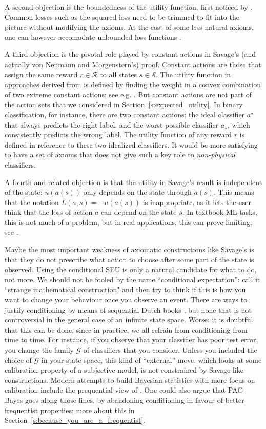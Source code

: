 A second objection is the boundedness of the utility function, first noticed by \citep{Fis70}. 
Common losses such as the squared loss need to be trimmed to fit into the picture without modifying the axioms.
At the cost of some less natural axioms, one can however accomodate unbounded loss functions \citep{Wak93}.

A third objection is the pivotal role played by constant actions in Savage's (and actually von Neumann and Morgenstern's) proof.
Constant actions are those that assign the same reward $r\in\mathcal{R}$ to all states $s\in\mathcal{S}$.
The utility function in approaches derived from \cite{VoMo} is defined by finding the weight in a convex combination of two extreme constant actions; see e.g. \citep[Chapter 3]{PaIn09}. 
But constant actions are not part of the action sets that we considered in Section~\ref{s:expected_utility}.
In binary classification, for instance, there are two constant actions: the ideal classifier $a^\star$ that always predicts the right label, and the worst possible classifier $a_\star$, which consistently predicts the wrong label. 
The utility function of any reward $r$ is defined in reference to these two idealized classifiers.  
It would be more satisfying to have a set of axioms that does not give such a key role to \emph{non-physical} classifiers. 

A fourth and related objection is that the utility in Savage's result is independent of the state: $u(a(s))$ only depends on the state through $a(s)$. 
This means that the notation $L(a,s) = -u(a(s))$ is inappropriate, as it lets the user think that the loss of action $a$ can depend on the state $s$. 
In textbook ML tasks, this is not much of a problem, but in real applications, this can prove limiting; see \citep[Chapter XXX]{PaIn09}.

Maybe the most important weakness of axiomatic constructions like Savage's is that they do not prescribe what action to choose after some part of the state is observed. 
Using the conditional SEU is only a natural candidate for what to do, not more.
We should not be fooled by the name ``conditional expectation'': call it ``strange mathematical construction" and then try to think if this is how you want to change your behaviour once you observe an event.
There are ways to justify conditioning by means of sequential Dutch books \citep{}, but none that is not controversial in the general case of an infinite state space.
Worse: it is doubtful that this can be done, since in practice, we all refrain from conditioning from time to time. 
For instance, if you observe that your classifier has poor test error, you change the family $\mathcal{G}$ of classifiers that you consider.
Unless you included the choice of $\mathcal{G}$ in your state space, this kind of ``external'' move, which looks at some calibration property of a subjective model, is not constrained by Savage-like constructions. 
Modern attempts to build Bayesian statistics with more focus on calibration include the prequential view of \cite{Daw}.
One could also argue that PAC-Bayes goes along those lines, by abandoning conditioning in favour of better frequentist properties; more about this in Section~\ref{s:because_you_are_a_frequentist}.

